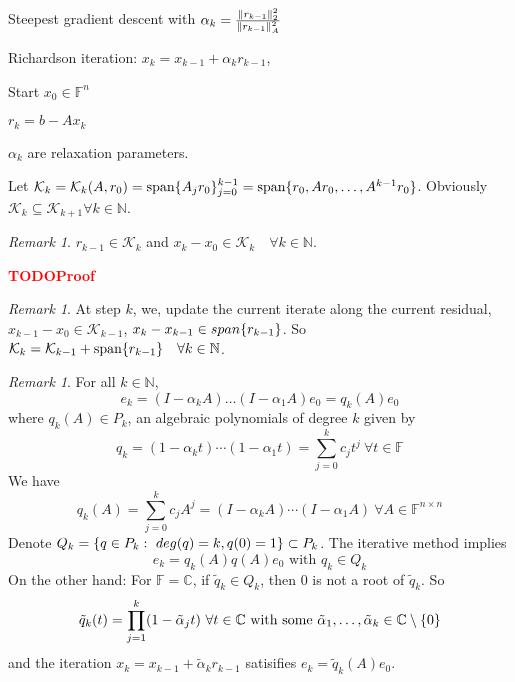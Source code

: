 \documentclass[12pt]{article}
\theoremstyle{definition}
\theoremstyle{remark}
\newtheorem{remark}[theorem]{Remark}
\numberwithin{equation}{section}
\newcommand{\F}{\mathbb{F}}
\newcommand{\C}{\mathbb{C}}
\newcommand{\N}{\mathbb{N}}
\newcommand{\TODO}[1][]{\textcolor{red}{\textbf{TODO\ifblank{#1}{}{:\ }#1} }}
\DeclarePairedDelimiter{\norm}{\lVert}{\rVert}
\DeclarePairedDelimiter{\set}{\{}{\}}
\begin{document}
\begin{mdframed}
  Steepest gradient descent with $\alpha_k = \frac{\norm{r_{k-1}}_2^2}{\norm{r_{k-1}}_A^2}$
\end{mdframed}
Richardson iteration: $x_k = x_{k-1} + \alpha_k r_{k-1}$,

Start $x_0 \in \F^n$

$r_k = b - Ax_k$

$\alpha_k$ are relaxation parameters.

\vspace{\topsep}
Let $\mathcal{K}_k = \mathcal{K}_k(A, r_0) = \textnormal{span}\set{A_j r_0}_{j=0}^{k-1} = \textnormal{span} \set{r_0, A r_0, \ldots, A^{k-1} r_0}$. Obviously $\mathcal{K}_k \subseteq \mathcal{K}_{k+1} \forall k \in \N$.
\begin{remark}
  $r_{k-1} \in \mathcal{K}_k$ and $x_k - x_0 \in \mathcal{K}_k \quad \forall k \in \N$.

  \TODO[Proof]
\end{remark}
\begin{remark}
  At step $k$, we, update the current iterate along the current residual, $x_{k-1} - x_0 \in \mathcal{K}_{k-1}$, $x_k - x_{k-1} \in \mathnormal{span}\set{r_{k-1}}$. So $\mathcal{K}_k = \mathcal{K}_{k-1} + \textnormal{span}\set{r_{k-1}} \quad \forall k \in \N$.
\end{remark}
\begin{remark}
  For all $k \in \N$,
  \begin{equation*}
    e_k = (I - \alpha_k A) \ldots (I - \alpha_1 A) e_0 = q_k(A)e_0
  \end{equation*}
  where $q_k(A) \in P_k$, an algebraic polynomials of degree $k$ given by
  \begin{equation*}
    q_k = (1 - \alpha_k t) \cdots (1 - \alpha_1 t) = \sum_{j=0}^k c_j t^j \ \forall t \in \F
  \end{equation*}
  We have
  \begin{equation*}
    q_k(A) = \sum_{j=0}^k c_j A^j = (I - \alpha_k A) \cdots (I - \alpha_1 A) \ \forall A \in \F^{n \times n}
  \end{equation*}
  Denote $Q_k = \set{q \in P_k:\ deg(q) = k, q(0) = 1} \subset P_k$. The iterative method implies
  \begin{equation*}
    e_k = q_k(A)q(A)e_0 \text{ with } q_k \in Q_k
  \end{equation*}
  On the other hand: For $\F = \C$, if $\tilde{q}_k \in Q_k$, then 0 is not a root of $\tilde{q}_k$. So
  \begin{equation*}
    \tilde{q}_k(t) = \prod_{j=1}^k (1 - \tilde{\alpha}_j t)\ \forall t \in \C \text{ with some } \tilde{\alpha}_1, \ldots, \tilde{\alpha}_k \in \C \setminus \set{0}
  \end{equation*}
  and the iteration $x_k = x_{k-1} + \tilde{\alpha}_k r_{k-1}$ satisifies $e_k = \tilde{q}_k(A)e_0$.
\end{remark}
\end{document}
